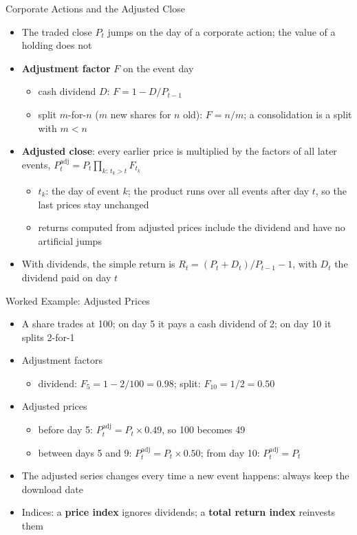 \begin{frame}{Corporate Actions and the Adjusted Close}
\itemsize{\small}
\begin{itemize}
    \item The traded close $P_t$ jumps on the day of a corporate action; the value of a holding does not
    \item \textbf{Adjustment factor} $F$ on the event day
    \begin{itemize}
        \item cash dividend $D$: $F = 1 - D/P_{t-1}$
        \item split $m$-for-$n$ ($m$ new shares for $n$ old): $F = n/m$; a consolidation is a split with $m < n$
    \end{itemize}
    \item \textbf{Adjusted close}: every earlier price is multiplied by the factors of all later events, $P^{\text{adj}}_t = P_t \prod_{k:\, t_k > t} F_{t_k}$
    \begin{itemize}
        \item $t_k$: the day of event $k$; the product runs over all events after day $t$, so the last prices stay unchanged
        \item returns computed from adjusted prices include the dividend and have no artificial jumps
    \end{itemize}
    \item With dividends, the simple return is $R_t = (P_t + D_t)/P_{t-1} - 1$, with $D_t$ the dividend paid on day $t$ 
\end{itemize}
\end{frame}

\begin{frame}{Worked Example: Adjusted Prices}
\itemsize{\small}
\begin{itemize}
    \item A share trades at 100; on day 5 it pays a cash dividend of 2; on day 10 it splits 2-for-1
    \item Adjustment factors
    \begin{itemize}
        \item dividend: $F_5 = 1 - 2/100 = 0.98$; split: $F_{10} = 1/2 = 0.50$
    \end{itemize}
    \item Adjusted prices
    \begin{itemize}
        \item before day 5: $P^{\text{adj}}_t = P_t \times 0.49$, so 100 becomes 49
        \item between days 5 and 9: $P^{\text{adj}}_t = P_t \times 0.50$; from day 10: $P^{\text{adj}}_t = P_t$
    \end{itemize}
    \item The adjusted series changes every time a new event happens: always keep the download date
    \item Indices: a \textbf{price index} ignores dividends; a \textbf{total return index} reinvests them
\end{itemize}
\end{frame}

